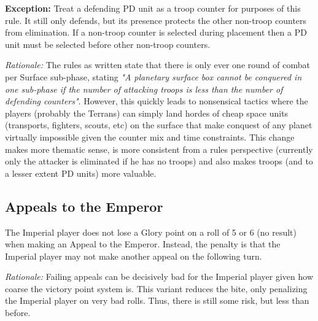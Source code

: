 \textbf{Exception:} Treat a defending PD unit as a troop counter for purposes of this rule. It still only defends, but its presence protects the other non-troop counters from elimination. If a non-troop counter is selected during placement then a PD unit must be selected before other non-troop counters.

\textit{Rationale:} The rules as written state that there is only ever one round of combat per Surface sub-phase, stating \textit{"A planetary surface box cannot be conquered in one sub-phase if the number of attacking troops is less than the number of defending counters"}. However, this quickly leads to nonsensical tactics where the players (probably the Terrans) can simply land hordes of cheap space units (transports, fighters, scouts, etc) on the surface that make conquest of any planet virtually impossible given the counter mix and time constraints. This change makes more thematic sense, is more consistent from a rules perspective (currently only the attacker is eliminated if he has no troops) and also makes troops (and to a lesser extent PD units) more valuable.

\subsection{Appeals to the Emperor}

The Imperial player does not lose a Glory point on a roll of 5 or 6 (no result) when making an Appeal to the Emperor. Instead, the penalty is that the Imperial player may not make another appeal on the following turn.

\textit{Rationale:} Failing appeals can be decisively bad for the Imperial player given how coarse the victory point system is. This variant reduces the bite, only penalizing the Imperial player on very bad rolls. Thus, there is still some risk, but less than before.
